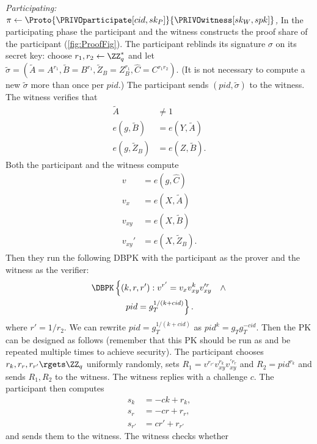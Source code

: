 \emph{Participating: \(\pi\gets
    \Proto{\PRIVOparticipate[cid, sk_P]}{\PRIVOwitness[sk_W, spk]}\),}
In the participating phase the participant and the witness constructs the proof 
share of the participant (\cref{fig:ProofFig}).
The participant reblinds its signature \(\sigma\) on its secret key: choose 
\(r_1, r_2\gets \ZZ_q^*\) and let \(
  \tilde\sigma = (\tilde A = A^{r_1},
                  \tilde B = B^{r_1},
                  \tilde Z_B = Z_B^{r_1},
                  \hat C = C^{r_1 r_2}).
\) (It is not necessary to compute a new \(\tilde\sigma\) more than once per 
\(pid\).)
The participant sends \((pid, \tilde\sigma)\) to the witness.
The witness verifies that
\begin{align*}
  \tilde A          &\neq 1 \\
  e(g, \tilde B)    &= e(Y, \tilde A) \\
  e(g, \tilde Z_B)  &= e(Z, \tilde B).
\end{align*}
Both the participant and the witness compute
\begin{align*}
  v &= e(g, \hat C) \\
  v_x &= e(X, \tilde A) \\
  v_{xy} &= e(X, \tilde B) \\
  v_{xy}' &= e(X, \tilde Z_B).
\end{align*}
Then they run the following \ac{DBPK} with the participant as the prover and the 
witness as the verifier:
\begin{multline*}\label{eq:DBPK}
  \DBPK\left\{(k, r, r') :
    v^{r'} = v_x v_{xy}^k v_{xy}^{\prime r} \quad \land \right. \\
      \left. pid = g_T^{1/(k+cid)} \right\}.
\end{multline*}
where \(r' = 1/r_2\).
We can rewrite \(pid = g_T^{1/(k+cid)}\) as \(pid^k = g_T g_T^{-cid}\).
Then the \ac{PK} can be designed as follows (remember that this \ac{PK} should 
be run as  and be repeated multiple times to achieve security).
The participant chooses \(r_k, r_r, r_{r'}\rgets \ZZ_q\) uniformly randomly, 
sets \(R_1 = v^{r_{r'}} v_{xy}^{r_k} v_{xy}^{\prime r_r}\) and \(R_2 = 
  pid^{r_k}\) and sends \(R_1, R_2\) to the witness.
The witness replies with a challenge \(c\).
The participant then computes
\begin{align*}
  s_k &= -ck + r_k, \\
  s_r &= -cr + r_r, \\
  s_{r'} &= cr' + r_{r'}
\end{align*}
and sends them to the witness.
The witness checks whether

